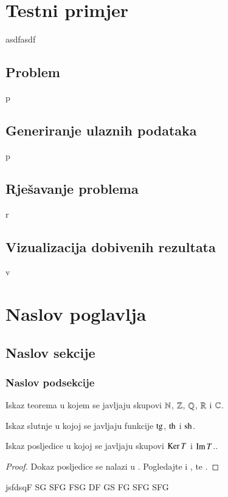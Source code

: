 \documentclass[a4paper,twoside,12pt]{memoir} %
\begin{document}
\chapter{Testni primjer}
asdfasdf

\section{Problem}
p

\section{Generiranje ulaznih podataka}
p

\section{Rješavanje problema}
r

\section{Vizualizacija dobivenih rezultata}
v









\chapter[Naslov poglavlja u sadržaju][Kratki naslov poglavlja]{Naslov poglavlja}	

\section[Naslov sekcije u sadržaju][Kratki naslov sekcije]{Naslov sekcije}
\subsection{Naslov podsekcije}
\begin{thm}
Iskaz teorema u kojem se javljaju skupovi  $\mathbb{N}$, $\mathbb{Z}$, $\mathbb{Q}$, $\mathbb{R}$ i $\mathbb{C}$.
\end{thm}
\begin{conj}
Iskaz slutnje u kojoj se javljaju funkcije $\operatorname{tg}$, $\operatorname{th}$ i $\operatorname{sh}$.
\end{conj}
\begin{cor}
Iskaz posljedice u kojoj se javljaju skupovi $\operatorname{Ker} T$ i $\operatorname{Im} T$..
\end{cor}
\begin{proof}
Dokaz posljedice se nalazi u \cite{kljuc}. Pogledajte i \cite{kurepa1956convex}, \cite{kurepa1981funkcionalna} te \cite{Dutkay:2009}.
\end{proof}
jsfdsqF
SG
SFG
FSG
DF
GS
FG
SFG
SFG
\end{document}
